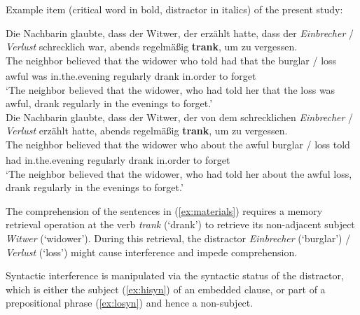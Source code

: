 \documentclass[a4paper, man, floatsintext]{apa7}
\begin{document}
\begin{exe}  
\ex \label{ex:materials} Example item (critical word in bold, distractor in italics) of the present study:
    \begin{xlist}   
    \label{ex:hisyn} 
    \gll Die  Nachbarin glaubte,	dass	der Witwer,  der  erzählt hatte, dass der \textit{Einbrecher} / \textit{Verlust}  schrecklich war, abends regelmäßig \textbf{trank}, um zu vergessen.\\ 
    The\textsubscript{} neighbor\textsubscript{} believed that the widower who told had that the burglar / loss awful was in.the.evening regularly drank in.order to forget \\
    \trans `The neighbor believed that the widower, who had told her that the loss was awful, drank regularly in the evenings to forget.' \\
    
    \label{ex:losyn} 
    \gll Die  Nachbarin glaubte, dass der Witwer,  der  von    dem schrecklichen \textit{Einbrecher} / \textit{Verlust} erzählt hatte, abends regelmäßig \textbf{trank}, um zu vergessen. \\ 
    The\textsubscript{} neighbor\textsubscript{} believed that the widower who about the awful burglar / loss told had in.the.evening regularly drank in.order to forget\\
    \trans `The neighbor believed that the widower, who had told her about the awful loss, drank regularly in the evenings to forget.'  \\
    \end{xlist}
\end{exe}

The comprehension of the sentences in (\ref{ex:materials}) requires a memory retrieval operation at the verb \textit{trank} (`drank') to retrieve its non-adjacent subject \textit{Witwer} (`widower'). During this retrieval, the distractor \textit{Einbrecher} (`burglar') / \textit{Verlust} (`loss') might cause interference and impede comprehension. 

Syntactic interference is manipulated via the syntactic status of the distractor, which is either the subject (\ref{ex:hisyn}) of an embedded clause, or part of a prepositional phrase (\ref{ex:losyn}) and hence a non-subject. \label{franck_refs}
\end{document}
